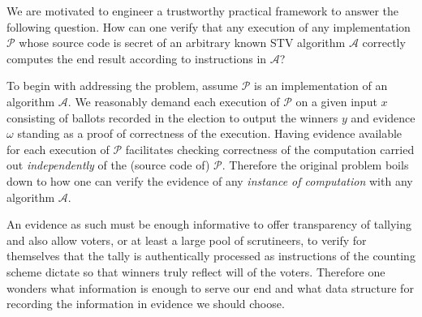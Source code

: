 \documentclass[10pt,conference]{IEEEtran}
\begin{document}
We are motivated to engineer a trustworthy practical  framework to answer the following question. How can one verify that any execution of any implementation $\mathcal{P}$ whose source code is secret of an arbitrary  known STV algorithm $\mathcal{A}$ correctly computes the end result according to instructions in $\mathcal{A}$?  



To begin with addressing the problem, assume $\mathcal{P}$ is an implementation of an algorithm $\mathcal{A}$. We reasonably demand each execution of $\mathcal{P}$ on a given input $x$ consisting of ballots recorded in the election to output the winners $y$ and evidence $\omega$ standing as a proof of correctness of the execution.
 Having evidence available for each execution of $\mathcal{P}$ facilitates checking correctness of the computation carried out \emph{independently} of the (source code of) $\mathcal{P}$. Therefore the original problem boils down to how one can verify the evidence of any \emph{instance of computation} with any algorithm $\mathcal{A}$.


An evidence as such must be enough informative to offer transparency of tallying and also allow  voters, or at least a large pool of scrutineers, to verify for themselves that the tally is authentically processed as instructions of the counting scheme dictate so that winners truly reflect will of the voters. 
Therefore one wonders what information is enough 
to serve our end and what data structure for recording the information in evidence we should choose.
\end{document}
